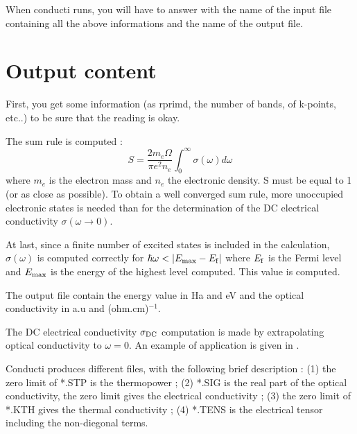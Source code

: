 \documentclass[a4,12pts]{article}
\begin{document}
When conducti runs, you will have to answer with the name of the input file containing all the 
above informations and the name of the output file.

\section{Output content}
First, you get some information (as rprimd, the number of bands, of k-points, etc..) to be
sure that the reading is okay.

The sum rule is computed \cite{KUBO57}: 
% 
\begin{equation} 
 S= \frac{2 m_e \Omega}{\pi e^2 n_e} \int_0^\infty \sigma(\omega) d\omega
\end{equation} 
% 
where $m_e$ is the electron mass and $n_e$ the electronic density. S must be equal to 1 (or
as close as possible).
To obtain a well converged sum rule, more unoccupied electronic
states is needed than for the 
determination of the DC electrical conductivity $\sigma(\omega \rightarrow 0)$. 

At last, since a finite number of excited states is included in the calculation,  
$\sigma(\omega)$ is computed correctly for $\hbar\omega<|E_{\rm max}-E_{\rm f}|$ where 
$E_{\rm f}$ is the Fermi level and $E_{\rm max}$ is the energy of the highest level computed.
This value is computed.
 

The output file contain the energy value in Ha and eV and the optical conductivity in
a.u and (ohm.cm)$^{-1}$. 

The DC electrical conductivity $\sigma_{{\rm DC}}$ computation is made by 
extrapolating optical conductivity to $\omega=0$. An example
of application is given in \cite{RECO02}.

Conducti produces different files, with the following brief description :
(1) the zero limit of *.STP is the thermopower ; (2) *.SIG is the real part of the 
optical conductivity, the zero limit gives the electrical conductivity ;
(3) the zero limit of *.KTH gives the thermal conductivity ;
(4) *.TENS is the electrical tensor including the non-diegonal terms.
\end{document}
